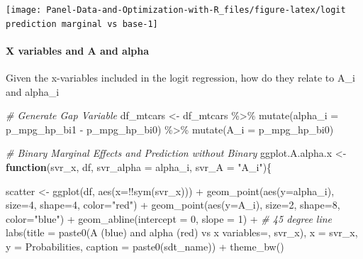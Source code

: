 \documentclass[
]{book}
\newenvironment{Shaded}{\begin{snugshade}}{\end{snugshade}}
\newcommand{\AttributeTok}[1]{\textcolor[rgb]{0.77,0.63,0.00}{#1}}
\newcommand{\CommentTok}[1]{\textcolor[rgb]{0.56,0.35,0.01}{\textit{#1}}}
\newcommand{\ControlFlowTok}[1]{\textcolor[rgb]{0.13,0.29,0.53}{\textbf{#1}}}
\newcommand{\DecValTok}[1]{\textcolor[rgb]{0.00,0.00,0.81}{#1}}
\newcommand{\FunctionTok}[1]{\textcolor[rgb]{0.00,0.00,0.00}{#1}}
\newcommand{\NormalTok}[1]{#1}
\newcommand{\OtherTok}[1]{\textcolor[rgb]{0.56,0.35,0.01}{#1}}
\newcommand{\SpecialCharTok}[1]{\textcolor[rgb]{0.00,0.00,0.00}{#1}}
\newcommand{\StringTok}[1]{\textcolor[rgb]{0.31,0.60,0.02}{#1}}
\begin{document}
\begin{center}\texttt{[image: Panel-Data-and-Optimization-with-R\_files/figure-latex/logit prediction marginal vs base-1]} \end{center}

\hypertarget{x-variables-and-a-and-alpha}{%
\paragraph{X variables and A and alpha}\label{x-variables-and-a-and-alpha}}

Given the x-variables included in the logit regression, how do they relate to A\_i and alpha\_i

\begin{Shaded}
\begin{Highlighting}[]
\CommentTok{\# Generate Gap Variable}
\NormalTok{df\_mtcars }\OtherTok{\textless{}{-}}\NormalTok{ df\_mtcars }\SpecialCharTok{\%\textgreater{}\%} \FunctionTok{mutate}\NormalTok{(}\AttributeTok{alpha\_i =}\NormalTok{ p\_mpg\_hp\_bi1 }\SpecialCharTok{{-}}\NormalTok{ p\_mpg\_hp\_bi0) }\SpecialCharTok{\%\textgreater{}\%}
                \FunctionTok{mutate}\NormalTok{(}\AttributeTok{A\_i =}\NormalTok{ p\_mpg\_hp\_bi0)}

\CommentTok{\# Binary Marginal Effects and Prediction without Binary}
\NormalTok{ggplot.A.alpha.x }\OtherTok{\textless{}{-}} \ControlFlowTok{function}\NormalTok{(svr\_x, df,}
                             \AttributeTok{svr\_alpha =} \StringTok{\textquotesingle{}alpha\_i\textquotesingle{}}\NormalTok{, }\AttributeTok{svr\_A =} \StringTok{"A\_i"}\NormalTok{)\{}

\NormalTok{  scatter }\OtherTok{\textless{}{-}} \FunctionTok{ggplot}\NormalTok{(df, }\FunctionTok{aes}\NormalTok{(}\AttributeTok{x=}\SpecialCharTok{!!}\FunctionTok{sym}\NormalTok{(svr\_x))) }\SpecialCharTok{+}
        \FunctionTok{geom\_point}\NormalTok{(}\FunctionTok{aes}\NormalTok{(}\AttributeTok{y=}\NormalTok{alpha\_i), }\AttributeTok{size=}\DecValTok{4}\NormalTok{, }\AttributeTok{shape=}\DecValTok{4}\NormalTok{, }\AttributeTok{color=}\StringTok{"red"}\NormalTok{) }\SpecialCharTok{+}
        \FunctionTok{geom\_point}\NormalTok{(}\FunctionTok{aes}\NormalTok{(}\AttributeTok{y=}\NormalTok{A\_i), }\AttributeTok{size=}\DecValTok{2}\NormalTok{, }\AttributeTok{shape=}\DecValTok{8}\NormalTok{, }\AttributeTok{color=}\StringTok{"blue"}\NormalTok{) }\SpecialCharTok{+}
        \FunctionTok{geom\_abline}\NormalTok{(}\AttributeTok{intercept =} \DecValTok{0}\NormalTok{, }\AttributeTok{slope =} \DecValTok{1}\NormalTok{) }\SpecialCharTok{+} \CommentTok{\# 45 degree line}
        \FunctionTok{labs}\NormalTok{(}\AttributeTok{title =} \FunctionTok{paste0}\NormalTok{(}\StringTok{\textquotesingle{}A (blue) and alpha (red) vs x variables=\textquotesingle{}}\NormalTok{, svr\_x),}
             \AttributeTok{x =}\NormalTok{ svr\_x,}
             \AttributeTok{y =} \StringTok{\textquotesingle{}Probabilities\textquotesingle{}}\NormalTok{,}
             \AttributeTok{caption =} \FunctionTok{paste0}\NormalTok{(sdt\_name)) }\SpecialCharTok{+}
        \FunctionTok{theme\_bw}\NormalTok{()}


\end{Highlighting}
\end{Shaded}
\end{document}

